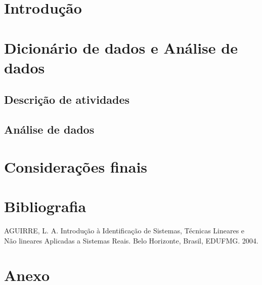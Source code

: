 \documentclass[a4paper, 12pt]{article}
\begin{document}
\newpage
{}
\section{Introdução}

\newpage
\section{Dicionário de dados e Análise de dados}
\subsection{Descrição de atividades}
\subsection{Análise de dados}
\newpage
\section{Considerações finais}
\newpage

\section*{Bibliografia}
\footnotesize{

\noindent AGUIRRE, L. A. Introdução à Identificação de Sistemas, Técnicas Lineares e Não lineares Aplicadas a Sistemas Reais. Belo Horizonte, Brasil, EDUFMG. 2004.\\

}
\newpage
{}
\section*{Anexo}
\end{document}
